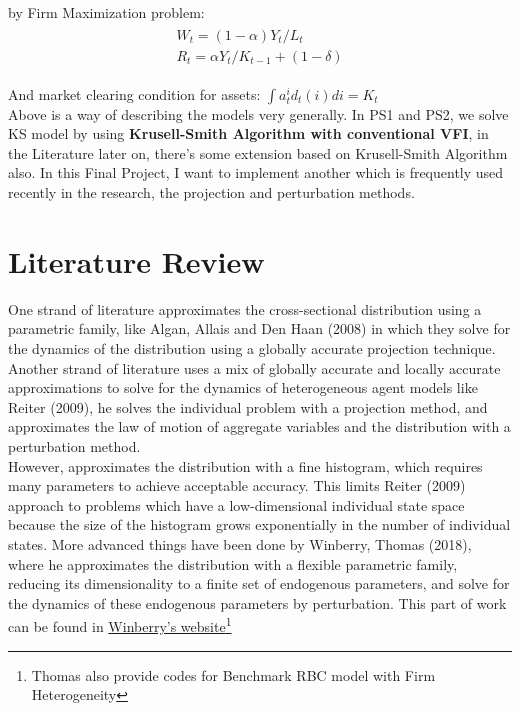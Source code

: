 by Firm Maximization problem: 
\begin{align}
\begin{split}
W_t = (1-\alpha)Y_t/L_{t} \\
R_t = \alpha Y_t/K_{t-1} + (1- \delta)
\end{split}
\end{align} 


And market clearing condition for assets: $\int a^i_t d_t (i)di = K_t$\\

Above is a way of describing the models very generally. In {\color{red} PS1 and PS2}, we solve KS model by using \textbf{Krusell-Smith Algorithm with conventional VFI}, in the Literature later on, there's some extension based on Krusell-Smith Algorithm also. In this Final Project, I want to implement another which is frequently used recently in the research, the projection and perturbation methods.\\

\section{Literature Review}\label{secLiter}

One strand of literature approximates the cross-sectional distribution using a parametric family, like Algan, Allais and Den Haan (2008)\cite{algan2008solving} in which they solve for the dynamics of the distribution using a globally accurate projection technique.\\

Another strand of literature uses a mix of globally accurate and locally accurate approximations to solve for the dynamics of heterogeneous agent models like Reiter (2009)\cite{reiter2009solving}, he solves the individual problem with a projection method, and approximates the law of motion of aggregate variables and the distribution with a perturbation method.\\

However, approximates the distribution with a fine histogram, which requires many parameters to achieve acceptable accuracy. This limits Reiter (2009)\cite{reiter2009solving} approach to problems which have a low-dimensional individual state space because the size of the histogram grows exponentially in the number of individual states. More advanced things have been done by Winberry, Thomas (2018)\cite{winberry2018method}, where he approximates the distribution with a flexible parametric family, reducing its dimensionality to a finite set of endogenous parameters, and solve for the dynamics of these endogenous parameters by perturbation. This part of work can be found in  \href{http://faculty.chicagobooth.edu/thomas.winberry/research/index.html}{Winberry's website}\footnote{Thomas also provide codes for Benchmark RBC model with Firm Heterogeneity}


